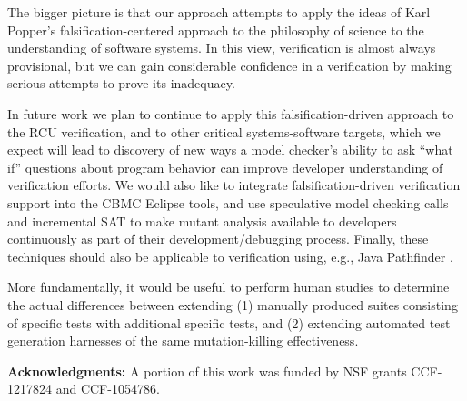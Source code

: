 \documentclass{svjour3}
\begin{document}
The bigger picture is that our approach
attempts to apply the ideas of Karl Popper's falsification-centered
approach to the philosophy of science to the understanding of software
systems.  In this view, verification is almost always provisional, but we can 
gain considerable confidence in a verification by making serious attempts to prove its inadequacy.

In future work we plan to continue to apply this falsification-driven
approach to the RCU verification, and to other critical
systems-software targets, which we expect will lead to discovery of
new ways a model checker's ability to ask ``what if'' questions about
program behavior \cite{GroceDist,MakeMost} can improve developer
understanding of verification efforts.   We would also like to
integrate falsification-driven verification support into the CBMC
Eclipse tools, and use speculative model checking calls and
incremental SAT to make mutant analysis available to developers
continuously as part of their development/debugging process.  Finally,
these techniques should also be applicable to verification using,
e.g., Java Pathfinder \cite{JPF2}.

More fundamentally, it would be useful to perform human studies to
determine the actual differences between extending (1)
manually produced suites consisting of specific tests with additional specific
tests, and (2) extending automated test generation harnesses of the
same mutation-killing effectiveness. 

{\bf Acknowledgments:}
A portion of this work was funded by NSF grants CCF-1217824
and CCF-1054786.



%







%
%
%
% 




\end{document}
